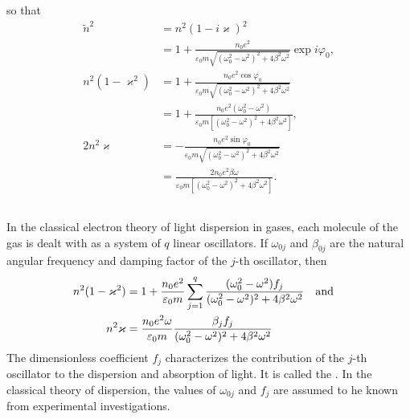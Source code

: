 so that
\begin{align*}%
\tilde{n}^{2} & = n^{2} (1 - i \varkappa)^{2}\\
&  = 1 + \frac{n_{0}e^{2}}{\varepsilon_{0} m \sqrt{(\omega_{0}^{2} - \omega^{2})^{2} + 4 \beta^{2}\omega^{2}}} \exp i \varphi_{0},\\
n^{2} (1 - \varkappa^{2}) & = 1 + \frac{n_{0}e^{2} \cos \varphi_{0}}{\varepsilon_{0} m \sqrt{(\omega_{0}^{2} - \omega^{2})^{2} + 4 \beta^{2}\omega^{2}}} \\
& = 1 + \frac{n_{0}e^{2} (\omega_{0}^{2} - \omega^{2})}{\varepsilon_{0} m [(\omega_{0}^{2} - \omega^{2})^{2} + 4 \beta^{2}\omega^{2}]},\\
2 n^{2} \varkappa & = - \frac{n_{0}e^{2}\sin \varphi_{0}}{\varepsilon_{0} m \sqrt{(\omega_{0}^{2} - \omega^{2})^{2} + 4 \beta^{2}\omega^{2}}} \\
& = \frac{2 n_{0}e^{2}\beta \omega}{\varepsilon_{0} m [(\omega_{0}^{2} - \omega^{2})^{2} + 4 \beta^{2}\omega^{2}]}.
\end{align*}

\subsection{}\label{34.5.4} In the classical electron theory of light dispersion in gases, each molecule of the gas is dealt with as a system of $q$ linear oscillators. If $\omega_{0j}$ and $\beta_{0j}$ are the natural angular frequency and damping factor of the $j$-th oscillator, then
\begin{align*}%
n^{2} (1 - \varkappa^{2}) & = 1 + \frac{n_{0}e^{2}}{\varepsilon_{0} m} \sum_{j=1}^{q} \frac{(\omega_{0}^{2} - \omega^{2}) f_{j}}{(\omega_{0}^{2} - \omega^{2})^{2} + 4 \beta^{2}\omega^{2}} \qand \\
n^{2} \varkappa & = \frac{n_{0}e^{2}\omega}{\varepsilon_{0}m}  \frac{\beta_{j}f_{j}}{(\omega_{0}^{2} - \omega^{2})^{2} + 4 \beta^{2}\omega^{2}}
\end{align*}
The dimensionless coefficient $f_{j}$ characterizes the contribution of the $j$-th oscillator to the dispersion and absorption of light. It is called the . In the classical theory of dispersion,
the values of $\omega_{0j}$ and $f_{j}$ are assumed to he known from experimental investigations.


